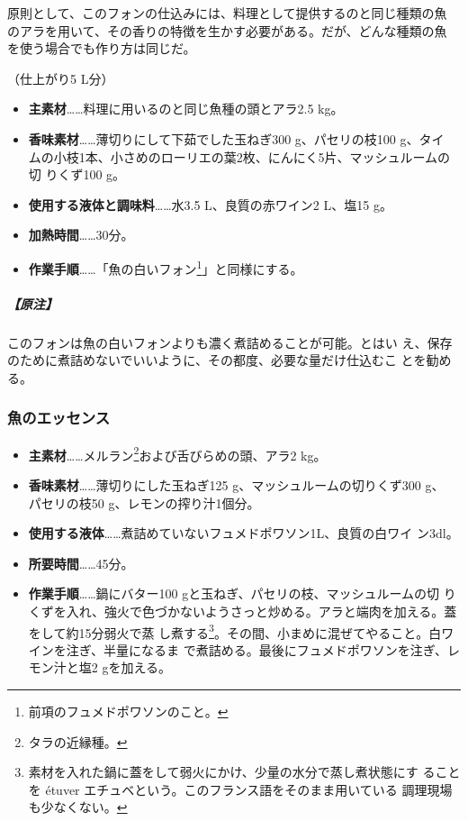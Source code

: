 \begin{recette}
原則として、このフォンの仕込みには、料理として提供するのと同じ種類の魚
のアラを用いて、その香りの特徴を生かす必要がある。だが、どんな種類の魚
を使う場合でも作り方は同じだ。

（仕上がり5 L分）

\begin{itemize}
\item
  \textbf{主素材}\ldots{}\ldots{}料理に用いるのと同じ魚種の頭とアラ2.5
  kg。
\item
  \textbf{香味素材}\ldots{}\ldots{}薄切りにして下茹でした玉ねぎ300
  g、パセリの枝100 g、タイ
  ムの小枝1本、小さめのローリエの葉2枚、にんにく5片、マッシュルームの切
  りくず100 g。
\item
  \textbf{使用する液体と調味料}\ldots{}\ldots{}水3.5 L、良質の赤ワイン2
  L、塩15 g。
\item
  \textbf{加熱時間}\ldots{}\ldots{}30分。
\item
  \textbf{作業手順}\ldots{}\ldots{}「魚の白いフォン\footnote{前項のフュメドポワソンのこと。}」と同様にする。
\end{itemize}

\hypertarget{nota-fonds-de-poisson-au-vin-rouge}{%
\subparagraph{【原注】}\label{nota-fonds-de-poisson-au-vin-rouge}}

このフォンは魚の白いフォンよりも濃く煮詰めることが可能。とはい
え、保存のために煮詰めないでいいように、その都度、必要な量だけ仕込むこ
とを勧める。

\hypertarget{essence-de-poisson}{%
\subsubsection{魚のエッセンス}\label{essence-de-poisson}}



\begin{itemize}
\item
  \textbf{主素材}\ldots{}\ldots{}メルラン\footnote{タラの近縁種。}および舌びらめの頭、アラ2
  kg。
\item
  \textbf{香味素材}\ldots{}\ldots{}薄切りにした玉ねぎ125
  g、マッシュルームの切りくず300 g、 パセリの枝50
  g、レモンの搾り汁1個分。
\item
  \textbf{使用する液体}\ldots{}\ldots{}煮詰めていないフュメドポワソン1\undemi{}L、良質の白ワイ
  ン3dl。
\item
  \textbf{所要時間}\ldots{}\ldots{}45分。
\item
  \textbf{作業手順}\ldots{}\ldots{}鍋にバター100
  gと玉ねぎ、パセリの枝、マッシュルームの切
  りくずを入れ、強火で色づかないようさっと炒める。アラと端肉を加える。蓋をして約15分弱火で蒸
  し煮する\footnote{素材を入れた鍋に蓋をして弱火にかけ、少量の水分で蒸し煮状態にす
    ることを étuver エチュベという。このフランス語をそのまま用いている
    調理現場も少なくない。}。その間、小まめに混ぜてやること。白ワインを注ぎ、半量になるま
  で煮詰める。最後にフュメドポワソンを注ぎ、レモン汁と塩2 gを加える。
\end{itemize}


\end{recette}
